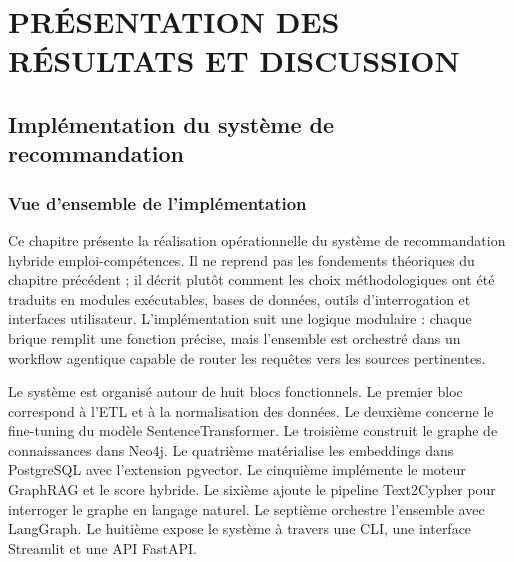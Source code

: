 \documentclass[12pt,twoside]{report}
\newcommand{\LLM}{\textsc{llm}}
\begin{document}


\part{PRÉSENTATION DES RÉSULTATS ET DISCUSSION}


\iffalse
\chapter{Implémentation du système de recommandation}
\vspace{-1.4cm}

\section{Vue d'ensemble de l'implémentation}

Ce chapitre présente la réalisation opérationnelle du système de recommandation hybride emploi-compétences. Il ne reprend pas les fondements théoriques du chapitre précédent ; il décrit plutôt comment les choix méthodologiques ont été traduits en modules exécutables, bases de données, outils d'interrogation et interfaces utilisateur. L'implémentation suit une logique modulaire : chaque brique remplit une fonction précise, mais l'ensemble est orchestré dans un workflow agentique capable de router les requêtes vers les sources pertinentes.

Le système est organisé autour de huit blocs fonctionnels. Le premier bloc correspond à l'ETL et à la normalisation des données. Le deuxième concerne le fine-tuning du modèle SentenceTransformer. Le troisième construit le graphe de connaissances dans Neo4j. Le quatrième matérialise les embeddings dans PostgreSQL avec l'extension pgvector. Le cinquième implémente le moteur GraphRAG et le score hybride. Le sixième ajoute le pipeline Text2Cypher pour interroger le graphe en langage naturel. Le septième orchestre l'ensemble avec LangGraph. Le huitième expose le système à travers une CLI, une interface Streamlit et une API FastAPI.
\end{document}
